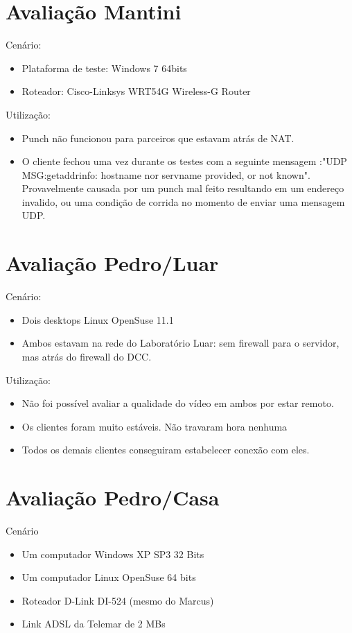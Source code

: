 \documentclass[12pt]{article}
\begin{document}
\section{Avaliação Mantini}

Cenário:

\begin{itemize}
\item Plataforma de teste: Windows 7 64bits
\item Roteador: Cisco-Linksys WRT54G Wireless-G Router
\end{itemize}

Utilização:
\begin{itemize}
\item Punch não funcionou para parceiros que estavam atrás de NAT.
\item O cliente fechou uma vez durante os testes com a seguinte mensagem :"UDP MSG:getaddrinfo: hostname nor servname provided, or not known". Provavelmente causada por um punch mal feito resultando em um endereço invalido, ou uma condição de corrida no momento de enviar uma mensagem UDP.
\end{itemize}

\section{Avaliação Pedro/Luar}
Cenário:
\begin{itemize}
\item Dois desktops Linux OpenSuse 11.1
\item Ambos estavam na rede do Laboratório Luar: sem firewall para o servidor, mas atrás do firewall do DCC.
\end{itemize}

Utilização:
\begin{itemize}
\item Não foi possível avaliar a qualidade do vídeo em ambos por estar remoto.
\item Os clientes foram muito estáveis. Não travaram hora nenhuma
\item Todos os demais clientes conseguiram estabelecer conexão com eles.
\end{itemize}

\section{Avaliação Pedro/Casa}
Cenário
\begin{itemize}
\item Um computador Windows XP SP3 32 Bits
\item Um computador Linux OpenSuse 64 bits
\item Roteador D-Link DI-524 (mesmo do Marcus)
\item Link ADSL da Telemar de 2 MBs
\end{itemize}
\end{document}
